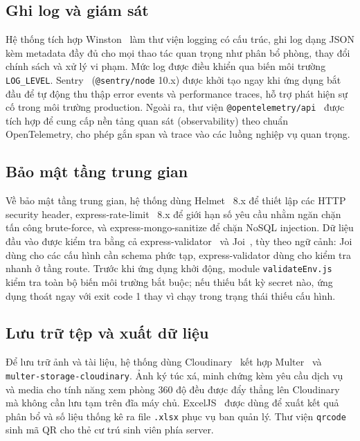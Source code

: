 \documentclass[../DoAn.tex]{subfiles}
\begin{document}
\subsection*{Ghi log và giám sát}

Hệ thống tích hợp Winston~\cite{winston_docs} làm thư viện logging có cấu trúc,
ghi log dạng JSON kèm metadata đầy đủ cho mọi thao tác quan trọng như phân bổ
phòng, thay đổi chính sách và xử lý vi phạm. Mức log được điều khiển qua biến
môi trường \texttt{LOG\_LEVEL}. Sentry~\cite{sentry_docs} (\texttt{@sentry/node}
10.x) được khởi tạo ngay khi ứng dụng bắt đầu để tự động thu thập error events
và performance traces, hỗ trợ phát hiện sự cố trong môi trường production.
Ngoài ra, thư viện \texttt{@opentelemetry/api}~\cite{opentelemetry_docs} được
tích hợp để cung cấp nền tảng quan sát (observability) theo chuẩn OpenTelemetry,
cho phép gắn span và trace vào các luồng nghiệp vụ quan trọng.

\subsection*{Bảo mật tầng trung gian}

Về bảo mật tầng trung gian, hệ thống dùng Helmet~\cite{helmet_docs} 8.x để
thiết lập các HTTP security header, express-rate-limit~\cite{express_rate_limit}
8.x để giới hạn số yêu cầu nhằm ngăn chặn tấn công brute-force, và
express-mongo-sanitize để chặn NoSQL injection. Dữ liệu đầu vào được kiểm
tra bằng cả express-validator~\cite{express_validator_docs} và
Joi~\cite{joi_docs}, tùy theo ngữ cảnh: Joi dùng cho các cấu hình cần schema
phức tạp, express-validator dùng cho kiểm tra nhanh ở tầng route. Trước khi
ứng dụng khởi động, module \texttt{validateEnv.js} kiểm tra toàn bộ biến môi
trường bắt buộc; nếu thiếu bất kỳ secret nào, ứng dụng thoát ngay với exit
code 1 thay vì chạy trong trạng thái thiếu cấu hình.

\subsection*{Lưu trữ tệp và xuất dữ liệu}

Để lưu trữ ảnh và tài liệu, hệ thống dùng
Cloudinary~\cite{cloudinary_docs} kết hợp Multer~\cite{multer_docs} và
\texttt{multer-storage-cloudinary}. Ảnh ký túc xá, minh chứng kèm yêu cầu dịch
vụ và media cho tính năng xem phòng 360 độ đều được đẩy thẳng lên Cloudinary
mà không cần lưu tạm trên đĩa máy chủ. ExcelJS~\cite{exceljs_docs} được dùng
để xuất kết quả phân bổ và số liệu thống kê ra file \texttt{.xlsx} phục vụ ban
quản lý. Thư viện \texttt{qrcode}~\cite{qrcode_docs} sinh mã QR cho thẻ cư
trú sinh viên phía server.
\end{document}
